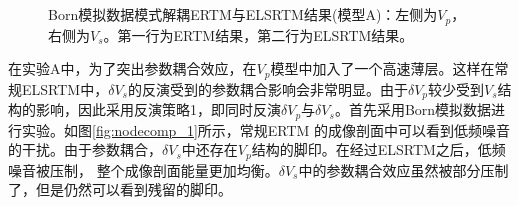 \begin{figure}[!htb]
   \centering
   \\
   \\
   \caption{Born模拟数据模式解耦ERTM与ELSRTM结果(模型A)：左侧为$V_p$，右侧为$V_s$。第一行为ERTM结果，第二行为ELSRTM结果。}
   \label{fig:decomp_1}
\end{figure}

在实验A中，为了突出参数耦合效应，在$V_p$模型中加入了一个高速薄层。这样在常规ELSRTM中，$\delta
V_s$的反演受到的参数耦合影响会非常明显。由于$\delta V_p$较少受到$V_s$结构的影响，因此采用反演策略1，即同时反演$\delta
V_p$与$\delta
V_s$。首先采用Born模拟数据进行实验。如图\ref{fig:nodecomp_1}所示，常规ERTM
的成像剖面中可以看到低频噪音的干扰。由于参数耦合，$\delta
V_s$中还存在$V_p$结构的脚印。在经过ELSRTM之后，低频噪音被压制，
整个成像剖面能量更加均衡。$\delta V_s$中的参数耦合效应虽然被部分压制了，但是仍然可以看到残留的脚印。

